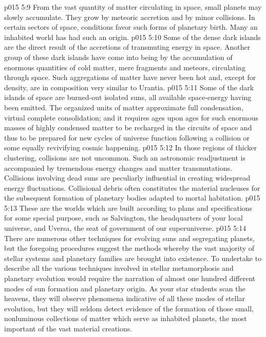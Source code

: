 \vs p015 5:9 \pc {}\bibnobreakspace {} From the vast quantity of matter circulating in space, small planets may slowly accumulate. They grow by meteoric accretion and by minor collisions. In certain sectors of space, conditions favor such forms of planetary birth. Many an inhabited world has had such an origin.
\vs p015 5:10 Some of the dense dark islands are the direct result of the accretions of transmuting energy in space. Another group of these dark islands have come into being by the accumulation of enormous quantities of cold matter, mere fragments and meteors, circulating through space. Such aggregations of matter have never been hot and, except for density, are in composition very similar to Urantia.
\vs p015 5:11 \pc {}\bibnobreakspace {} Some of the dark islands of space are burned\hyp{}out isolated suns, all available space\hyp{}energy having been emitted. The organized units of matter approximate full condensation, virtual complete consolidation; and it requires ages upon ages for such enormous masses of highly condensed matter to be recharged in the circuits of space and thus to be prepared for new cycles of universe function following a collision or some equally revivifying cosmic happening.
\vs p015 5:12 \pc {}\bibnobreakspace {} In those regions of thicker clustering, collisions are not uncommon. Such an astronomic readjustment is accompanied by tremendous energy changes and matter transmutations. Collisions involving dead suns are peculiarly influential in creating widespread energy fluctuations. Collisional debris often constitutes the material nucleuses for the subsequent formation of planetary bodies adapted to mortal habitation.
\vs p015 5:13 \pc {}\bibnobreakspace {} These are the worlds which are built according to plans and specifications for some special purpose, such as Salvington, the headquarters of your local universe, and Uversa, the seat of government of our superuniverse.
\vs p015 5:14 \pc There are numerous other techniques for evolving suns and segregating planets, but the foregoing procedures suggest the methods whereby the vast majority of stellar systems and planetary families are brought into existence. To undertake to describe all the various techniques involved in stellar metamorphosis and planetary evolution would require the narration of almost one hundred different modes of sun formation and planetary origin. As your star students scan the heavens, they will observe phenomena indicative of all these modes of stellar evolution, but they will seldom detect evidence of the formation of those small, nonluminous collections of matter which serve as inhabited planets, the most important of the vast material creations.
